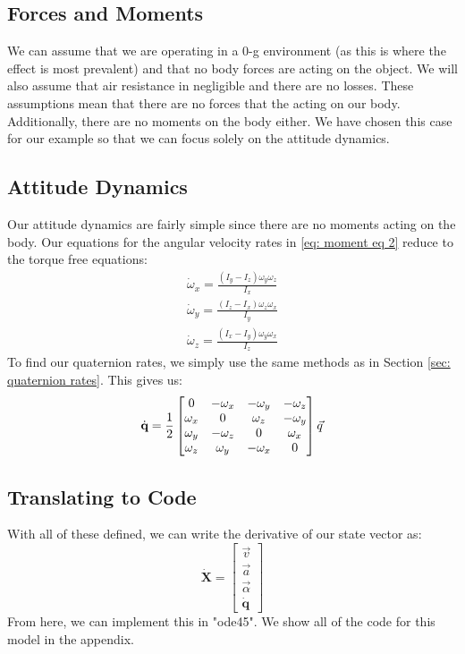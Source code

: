 \documentclass[12pt]{report}
\begin{document}
\subsection{Forces and Moments}
We can assume that we are operating in a 0-g environment (as this is where the effect is most prevalent) and that no body forces are acting on the object. We will also assume that air resistance in negligible and there are no losses. These assumptions mean that there are no forces that the acting on our body. Additionally, there are no moments on the body either. We have chosen this case for our example so that we can focus solely on the attitude dynamics.
\subsection{Attitude Dynamics}
Our attitude dynamics are fairly simple since there are no moments acting on the body. Our equations for the angular velocity rates in \eqref{eq: moment eq 2} reduce to the torque free equations:
\begin{gather}\label{eq: moment eq dzhan}
    \dot{\omega}_x=\frac{\left(I_y-I_z\right)\omega_y\omega_z}{I_x}\\
    \dot{\omega}_y=\frac{\left(I_z-I_x\right)\omega_z\omega_x}{I_y}\\
    \dot{\omega}_z=\frac{\left(I_x-I_y\right)\omega_y\omega_x}{I_z}
\end{gather}
To find our \gls{quaternion} rates, we simply use the same methods as in Section \ref{sec: quaternion rates}. This gives us:
\begin{gather}
{\color{black}\dot{\textbf{q}}=\frac{1}{2}\begin{bmatrix}
        0&-\omega_x&-\omega_y&-\omega_z\\
        \omega_x&0&\omega_z&-\omega_y\\
        \omega_y&-\omega_z&0&\omega_x\\
        \omega_z&\omega_y&-\omega_x&0
    \end{bmatrix}\vec{q}}
\end{gather}
\subsection{Translating to Code}
With all of these defined, we can write the derivative of our \gls{state vector} as:
\begin{equation}
    \dot{\textbf{X}}=\begin{bmatrix}
        \vec{v}\\\vec{a}\\\vec{\alpha}\\\dot{\textbf{q}}
    \end{bmatrix}
\end{equation}
From here, we can implement this in "ode45". We show all of the code for this model in the appendix.
\end{document}
